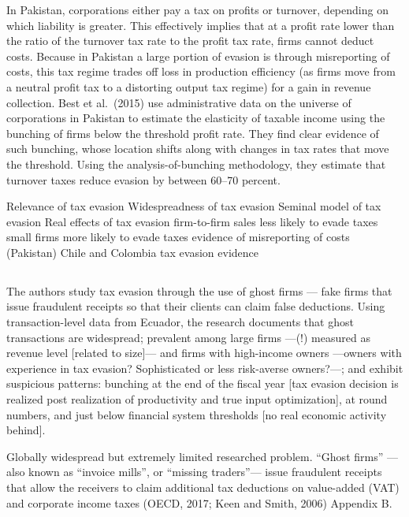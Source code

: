 \documentclass[
  12pt]{article}
\theoremstyle{definition}
\theoremstyle{remark}
\begin{document}
In Pakistan, corporations either pay a tax on profits or turnover,
depending on which liability is greater. This effectively implies that
at a profit rate lower than the ratio of the turnover tax rate to the
profit tax rate, firms cannot deduct costs. Because in Pakistan a large
portion of evasion is through misreporting of costs, this tax regime
trades off loss in production efficiency (as firms move from a neutral
profit tax to a distorting output tax regime) for a gain in revenue
collection. Best et al.~(2015) use administrative data on the universe
of corporations in Pakistan to estimate the elasticity of taxable income
using the bunching of firms below the threshold profit rate. They find
clear evidence of such bunching, whose location shifts along with
changes in tax rates that move the threshold. Using the
analysis-of-bunching methodology, they estimate that turnover taxes
reduce evasion by between 60--70 percent.

Relevance of tax evasion Widespreadness of tax evasion Seminal model of
tax evasion Real effects of tax evasion firm-to-firm sales less likely
to evade taxes small firms more likely to evade taxes evidence of
misreporting of costs (Pakistan) Chile and Colombia tax evasion evidence

\subsection{\texorpdfstring{\citet{Carrillo2022}}{@Carrillo2022}}\label{carrillo2022}

The authors study tax evasion through the use of ghost firms --- fake
firms that issue fraudulent receipts so that their clients can claim
false deductions. Using transaction-level data from Ecuador, the
research documents that ghost transactions are widespread; prevalent
among large firms ---(!) measured as revenue level {[}related to
size{]}--- and firms with high-income owners ---owners with experience
in tax evasion? Sophisticated or less risk-averse owners?---; and
exhibit suspicious patterns: bunching at the end of the fiscal year
{[}tax evasion decision is realized post realization of productivity and
true input optimization{]}, at round numbers, and just below financial
system thresholds {[}no real economic activity behind{]}.

Globally widespread but extremely limited researched problem. ``Ghost
firms'' ---also known as ``invoice mills'', or ``missing traders''---
issue fraudulent receipts that allow the receivers to claim additional
tax deductions on value-added (VAT) and corporate income taxes (OECD,
2017; Keen and Smith, 2006) Appendix B.
\end{document}
